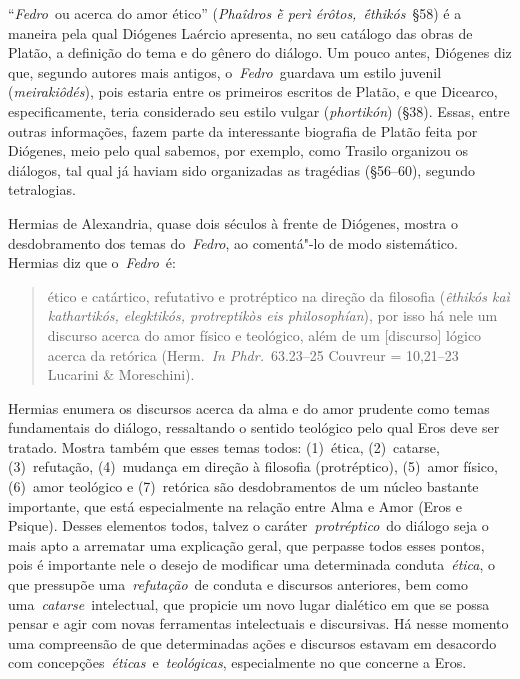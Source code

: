 


 
 

``\emph{Fedro}~ou acerca do amor ético'' (\emph{Phaîdros ḕ perì
érôtos,~ḗthikós}~§58) é a maneira pela qual Diógenes Laércio
apresenta, no seu catálogo das obras de Platão, a definição do tema e do
gênero do diálogo. Um pouco antes, Diógenes diz que, segundo autores mais
antigos, o~\emph{Fedro}~guardava um estilo juvenil (\emph{meirakiôdés}),
pois estaria entre os primeiros escritos de Platão, e que Dicearco,
especificamente, teria considerado seu estilo vulgar (\emph{phortikón})
(§38). Essas, entre outras informações, fazem parte da interessante
biografia de Platão feita por Diógenes, meio pelo qual sabemos, por
exemplo, como Trasilo organizou os diálogos, tal qual já haviam sido
organizadas as tragédias (§56--60), segundo tetralogias.

Hermias de Alexandria, quase dois séculos à frente de Diógenes, mostra o
desdobramento dos temas do~\emph{Fedro}, ao comentá"-lo de modo
sistemático. Hermias diz que o~\emph{Fedro}~é:

 

\begin{quote}
\redondo{[…]} ético e catártico, refutativo e protréptico na direção da
filosofia (\emph{êthikós kaì kathartikós, elegktikós, protreptikòs eis
philosophían}), por isso há nele um discurso acerca do amor físico e
teológico, além de um [discurso] lógico acerca da retórica
(Herm.~\emph{In Phdr.}~63.23--25 Couvreur = 10,21--23 Lucarini \&
Moreschini).
\end{quote}

 

Hermias enumera os discursos acerca da alma e do amor prudente como
temas fundamentais do diálogo, ressaltando o sentido teológico pelo qual
Eros deve ser tratado. Mostra também que esses temas todos: (1)~ética,
(2)~catarse, (3)~refutação, (4)~mudança em direção à filosofia
(protréptico), (5)~amor físico, (6)~amor teológico e (7)~retórica são
desdobramentos de um núcleo bastante importante, que está especialmente
na relação entre Alma e Amor (Eros e Psique). Desses elementos todos,
talvez o caráter~\emph{protréptico}~do diálogo seja o mais apto a
arrematar uma explicação geral, que perpasse todos esses pontos, pois é
importante nele o desejo de modificar uma determinada
conduta~\emph{ética}, o que pressupõe uma~\emph{refutação}~de conduta e
discursos anteriores, bem como uma~\emph{catarse}~intelectual, que
propicie um novo lugar dialético em que se possa pensar e agir com novas
ferramentas intelectuais e discursivas. Há nesse momento uma compreensão
de que determinadas ações e discursos estavam em desacordo com
concepções~\emph{éticas}~e~\emph{teológicas}, especialmente no que
concerne a Eros.

